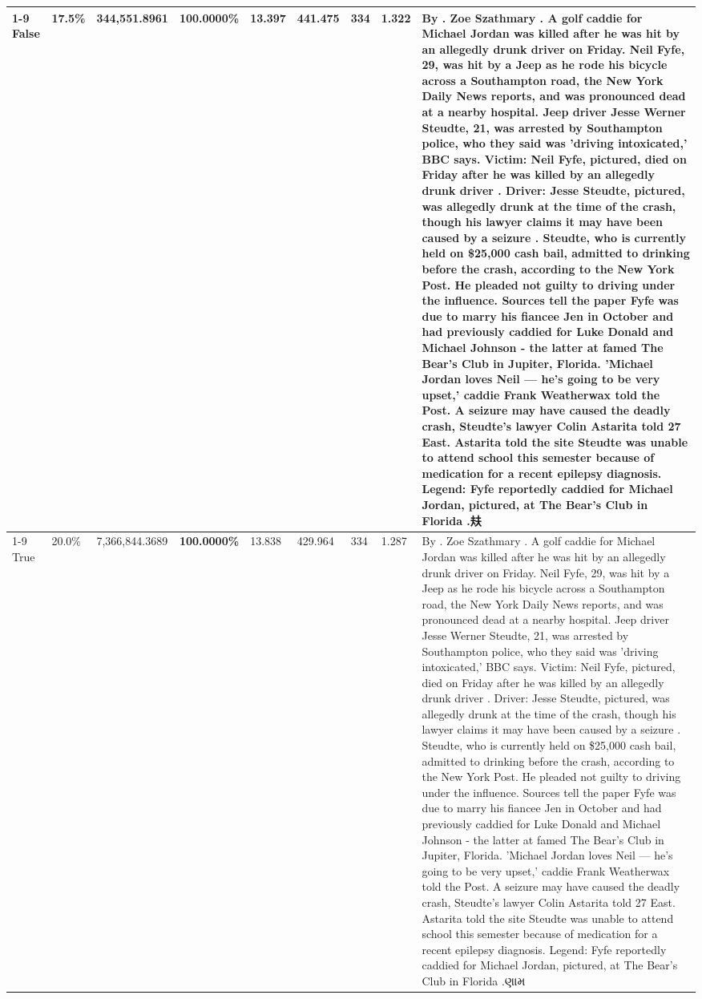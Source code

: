 \begin{table}[H]
\begin{tabular}{lllrlllll}
\cline{1-9}
False & 17.5\% & 344,551.8961 & \bfseries \color{red} 100.0000\% & 13.397 & 441.475 & 334 & 1.322 & By . Zoe Szathmary . A golf caddie for Michael Jordan was killed after he was hit by an allegedly drunk driver on Friday. Neil Fyfe, 29, was hit by a Jeep as he rode his bicycle across a Southampton road, the New York Daily News reports, and was pronounced dead at a nearby hospital. Jeep driver Jesse Werner Steudte, 21, was arrested by Southampton police, who they said was 'driving intoxicated,' BBC says. Victim: Neil Fyfe, pictured, died on Friday after he was killed by an allegedly drunk driver . Driver: Jesse Steudte, pictured, was allegedly drunk at the time of the crash, though his lawyer claims it may have been caused by a seizure . Steudte, who is currently held on \$25,000 cash bail, admitted to drinking before the crash, according to the New York Post. He pleaded not guilty to driving under the influence. Sources tell the paper Fyfe was due to marry his fiancee Jen in October and had previously caddied for Luke Donald and Michael Johnson - the latter at famed The Bear's Club in Jupiter, Florida. 'Michael Jordan loves Neil — he’s going to be very upset,' caddie Frank Weatherwax told the Post. A seizure may have caused the deadly crash, Steudte's lawyer Colin Astarita told 27 East. Astarita told the site Steudte was unable to attend school this semester because of medication for a recent epilepsy diagnosis. Legend: Fyfe reportedly caddied for Michael Jordan, pictured, at The Bear's Club in Florida .㚘 \\
\cline{1-9}
True & 20.0\% & 7,366,844.3689 & \bfseries \color{red} 100.0000\% & 13.838 & 429.964 & 334 & 1.287 & By . Zoe Szathmary . A golf caddie for Michael Jordan was killed after he was hit by an allegedly drunk driver on Friday. Neil Fyfe, 29, was hit by a Jeep as he rode his bicycle across a Southampton road, the New York Daily News reports, and was pronounced dead at a nearby hospital. Jeep driver Jesse Werner Steudte, 21, was arrested by Southampton police, who they said was 'driving intoxicated,' BBC says. Victim: Neil Fyfe, pictured, died on Friday after he was killed by an allegedly drunk driver . Driver: Jesse Steudte, pictured, was allegedly drunk at the time of the crash, though his lawyer claims it may have been caused by a seizure . Steudte, who is currently held on \$25,000 cash bail, admitted to drinking before the crash, according to the New York Post. He pleaded not guilty to driving under the influence. Sources tell the paper Fyfe was due to marry his fiancee Jen in October and had previously caddied for Luke Donald and Michael Johnson - the latter at famed The Bear's Club in Jupiter, Florida. 'Michael Jordan loves Neil — he’s going to be very upset,' caddie Frank Weatherwax told the Post. A seizure may have caused the deadly crash, Steudte's lawyer Colin Astarita told 27 East. Astarita told the site Steudte was unable to attend school this semester because of medication for a recent epilepsy diagnosis. Legend: Fyfe reportedly caddied for Michael Jordan, pictured, at The Bear's Club in Florida .ણામ \\

\end{tabular}
\end{table}
